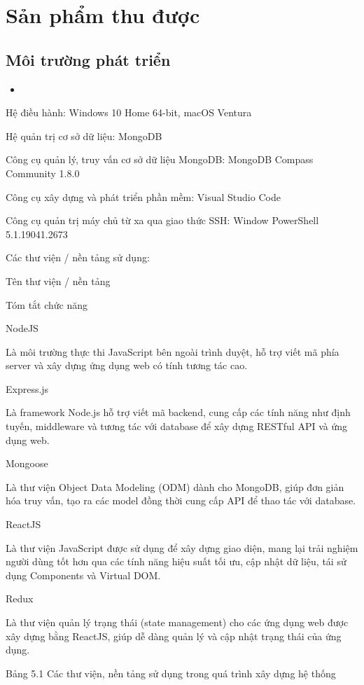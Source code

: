 \section{Sản phẩm thu được}

\subsection{Môi trường phát triển}

\begin{itemize}
    \item 
\end{itemize}
Hệ điều hành: Windows 10 Home 64-bit, macOS Ventura

Hệ quản trị cơ sở dữ liệu: MongoDB

Công cụ quản lý, truy vấn cơ sở dữ liệu MongoDB: MongoDB Compass Community 1.8.0

Công cụ xây dựng và phát triển phần mềm: Visual Studio Code

Công cụ quản trị máy chủ từ xa qua giao thức SSH: Window PowerShell 5.1.19041.2673

Các thư viện / nền tảng sử dụng:

Tên thư viện / nền tảng

Tóm tắt chức năng

NodeJS

Là môi trường thực thi JavaScript bên ngoài trình duyệt, hỗ trợ viết mã phía server và xây dựng ứng dụng web có tính tương tác cao.

Express.js

Là framework Node.js hỗ trợ viết mã backend, cung cấp các tính năng như định tuyến, middleware và tương tác với database để xây dựng RESTful API và ứng dụng web.

Mongoose

Là thư viện Object Data Modeling (ODM) dành cho MongoDB, giúp đơn giản hóa truy vấn, tạo ra các model đồng thời cung cấp API để thao tác với database.

ReactJS

Là thư viện JavaScript được sử dụng để xây dựng giao diện, mang lại trải nghiệm người dùng tốt hơn qua các tính năng hiệu suất tối ưu, cập nhật dữ liệu, tái sử dụng Components và Virtual DOM.

Redux

Là thư viện quản lý trạng thái (state management) cho các ứng dụng web được xây dựng bằng ReactJS, giúp dễ dàng quản lý và cập nhật trạng thái của ứng dụng.

Bảng 5.1 Các thư viện, nền tảng sử dụng trong quá trình xây dựng hệ thống

